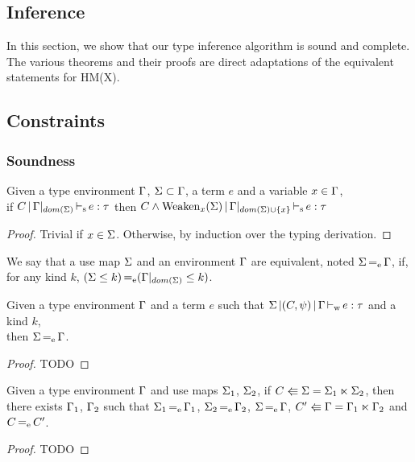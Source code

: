 \subsection{Inference}

In this section, we show that our type inference algorithm is sound and complete.
The various theorems and their proofs are direct adaptations
of the equivalent statements for HM(X).

\subsection{Constraints}



\subsubsection{Soundness}

\begin{lemma}
  \label{lemma:typ:weakening}
  Given a type environment $\Gamma$, $\Sigma \subset \Gamma$, a term $e$ and a variable $x\in\Gamma$,\\
  if $C \operatorname{|} \Gamma|_{dom(\Sigma)} \operatorname{\vdash_s} e : \tau$
  then $C\wedge \operatorname{Weaken}_{x}(\Sigma) \operatorname{|} \Gamma|_{dom(\Sigma)\cup\{x\}} \operatorname{\vdash_s} e : \tau$

  \begin{proof}
    Trivial if $x \in \Sigma$. Otherwise, by induction over the typing derivation.
  \end{proof}
\end{lemma}

We say that a use map $\Sigma$ and an environment $\Gamma$ are equivalent,
noted $\Sigma \operatorname{=_e} \Gamma$, if, for
any kind $k$, $(\Sigma \leq k) \operatorname{=_e} (\Gamma|_{dom(\Sigma)} \leq k)$.

\begin{lemma}
  \label{lemma:usemapequiv}
  Given a type environment $\Gamma$ and a term $e$ such
  that $\Sigma \operatorname{|} (C,\mathrm{\psi}) \operatorname{|} \Gamma \operatorname{\vdash_w} e : \tau$ and a kind $k$,\\
  then $\Sigma \operatorname{=_e} \Gamma$.
  \begin{proof}
    TODO
  \end{proof}
\end{lemma}


\begin{lemma}
  \label{lemma:equivsplit}
  Given a type environment $\Gamma$ and
  use maps $\Sigma_1$, $\Sigma_2$,
  if $C \Lleftarrow \Sigma = \Sigma_1 \ltimes \Sigma_2$, then
  there exists $\Gamma_1$, $\Gamma_2$ such that $\Sigma_1 \operatorname{=_e} \Gamma_1$,
  $\Sigma_2 \operatorname{=_e} \Gamma_2$,
  $\Sigma \operatorname{=_e} \Gamma$, $C' \Lleftarrow \Gamma = \Gamma_1 \ltimes \Gamma_2$ and $C\operatorname{=_e} C'$.
  \begin{proof}
    TODO
  \end{proof}
\end{lemma}


